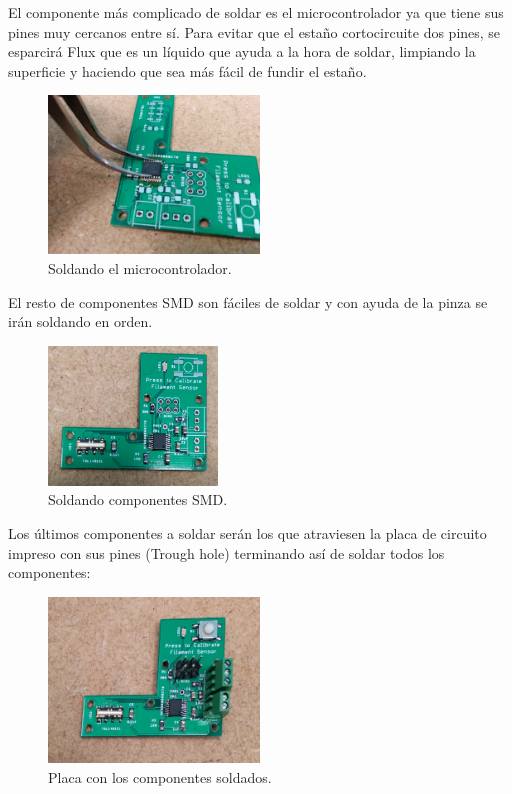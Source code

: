 El componente más complicado de soldar es el microcontrolador ya que tiene sus pines muy cercanos entre sí. Para evitar que el estaño cortocircuite dos pines, se esparcirá Flux que es un líquido que ayuda a la hora de soldar, limpiando la superficie y haciendo que sea más fácil de fundir el estaño.\\
   \begin{figure}[H]
            \centering
            \includegraphics[width=0.5\textwidth]{images/sensor/IMG_20150414_111135.jpg}
            \caption{Soldando el microcontrolador.}
            \label{fig:sens_micro}
    \end{figure}

El resto de componentes SMD son fáciles de soldar y con ayuda de la pinza se irán soldando en orden.
   \begin{figure}[H]
            \centering
            \includegraphics[width=0.4\textwidth]{images/sensor/IMG_20150414_135533.jpg}
            \caption{Soldando componentes SMD.}
            \label{fig:sens_SMD}
    \end{figure}
Los últimos componentes a soldar serán los que atraviesen la placa de circuito impreso con sus pines (Trough hole) terminando así de soldar todos los componentes:\\
   \begin{figure}[H]
            \centering
            \includegraphics[width=0.5\textwidth]{images/sensor/IMG_20150417_121941.jpg}
            \caption{Placa con los componentes soldados.}
            \label{fig:sens_SMD2}
    \end{figure}

